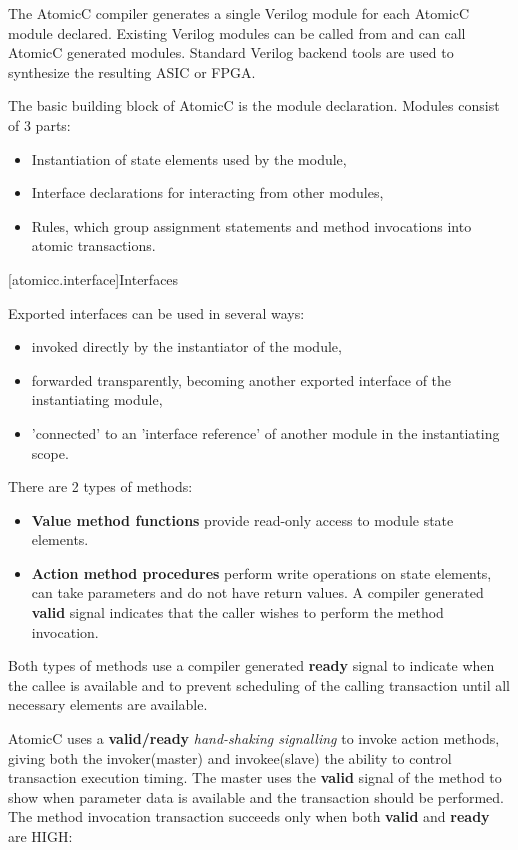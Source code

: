 The AtomicC compiler 
generates a single Verilog module for each AtomicC module declared.
Existing Verilog modules can be called from and can call AtomicC
generated modules.
Standard Verilog backend tools are used to synthesize
the resulting ASIC or FPGA.

The basic building block of AtomicC is the module declaration.
Modules consist of 3 parts:
\begin{itemize}
\item Instantiation of state elements used by the module,
\item Interface declarations for interacting from other modules,
\item Rules, which group assignment statements and method invocations into atomic transactions.
\end{itemize}

[atomicc.interface]{Interfaces}

Exported interfaces can be used in several ways:
\begin{itemize}
\item invoked directly by the instantiator of the module,
\item forwarded transparently, becoming another exported interface of the instantiating module,
\item 'connected' to an 'interface reference' of another module in the instantiating scope.
\end{itemize}

There are 2 types of methods:
\begin{itemize}
\item \textbf{Value method functions} provide read-only access to module state elements.
\item \textbf{Action method procedures} perform write operations on state elements,
can take parameters and do not have return values.
A compiler generated
\textbf{valid} signal indicates that the caller wishes to perform the method invocation.
\end{itemize}

Both types of methods use a compiler generated \textbf{ready} signal
to indicate when the callee is available and
to prevent scheduling of the calling transaction until all necessary elements are
available.

AtomicC uses a \textbf{valid/ready} \textit{hand-shaking signalling}
\cite{Fletcher2009, AXISpec} to invoke action methods,
giving both the invoker(master) and invokee(slave) the ability to control transaction
execution timing.
The master uses the \textbf{valid} signal
of the method to show when parameter data is available and the transaction should be performed.
The method invocation transaction succeeds only when
both \textbf{valid} and \textbf{ready} are HIGH:

